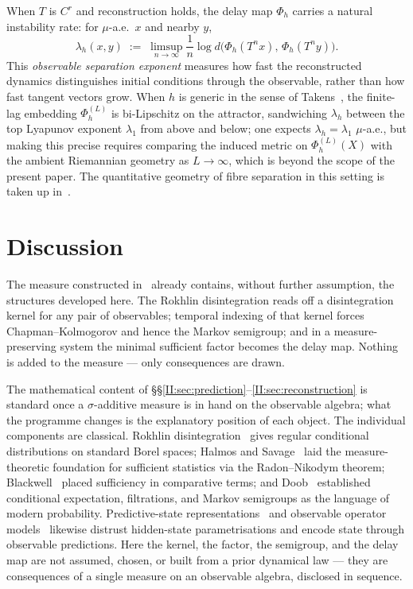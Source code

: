 \begin{remark}
\label{II:rem:lyapunov}
When $T$ is $C^r$ and reconstruction holds, the delay map $\Phi_h$ carries a
natural instability rate: for $\mu$-a.e.\ $x$ and nearby $y$,
\[
  \lambda_h(x,y)
  \;:=\;
  \limsup_{n\to\infty} \frac{1}{n}
  \log d\!\bigl(\Phi_h(T^n x),\, \Phi_h(T^n y)\bigr).
\]
This \emph{observable separation exponent} measures how fast the reconstructed
dynamics distinguishes initial conditions through the observable, rather than
how fast tangent vectors grow.  When $h$ is generic in the sense of
Takens~\cite{Takens1981}, the finite-lag embedding $\Phi_h^{(L)}$ is
bi-Lipschitz on the attractor, sandwiching $\lambda_h$ between the top
Lyapunov exponent $\lambda_1$ from above and below; one expects
$\lambda_h = \lambda_1$ $\mu$-a.e., but making this precise requires
comparing the induced metric on $\Phi_h^{(L)}(X)$ with the ambient
Riemannian geometry as $L \to \infty$, which is beyond the scope of the
present paper.  The quantitative geometry of fibre separation in this setting
is taken up in~\cite{mahon_paper3}.
\end{remark}


\section{Discussion}
\label{II:sec:discussion}

The measure constructed in~\cite{mahon_paper1} already contains, without
further assumption, the structures developed here.  The Rokhlin
disintegration reads off a disintegration kernel for any pair
of observables; temporal indexing of that kernel forces
Chapman--Kolmogorov and hence the Markov semigroup; and in a
measure-preserving system the minimal sufficient factor becomes the
delay map.  Nothing is added to the measure --- only consequences are
drawn.

The mathematical content of §§\ref{II:sec:prediction}--\ref{II:sec:reconstruction} is standard once a $\sigma$-additive measure is in hand on the observable algebra; what the programme changes is the explanatory position of each object.  The individual components are classical.  Rokhlin disintegration~\cite{Rokhlin1952}
gives regular conditional distributions on standard Borel spaces; Halmos and
Savage~\cite{HalmosSavage1949} laid the measure-theoretic foundation for sufficient
statistics via the Radon--Nikodym theorem; Blackwell~\cite{Blackwell1953} placed
sufficiency in comparative terms; and Doob~\cite{Doob1953} established conditional
expectation, filtrations, and Markov semigroups as the language of modern probability.
Predictive-state representations~\cite{Littman2001} and observable operator
models~\cite{Jaeger2000} likewise distrust hidden-state parametrisations and encode
state through observable predictions.  Here the kernel, the factor, the semigroup,
and the delay map are not assumed, chosen, or built from a prior dynamical law ---
they are consequences of a single measure on an observable algebra, disclosed in
sequence.

